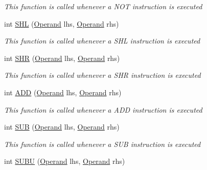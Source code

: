 \begin{DoxyCompactItemize}
\begin{DoxyCompactList}\small\item\em This function is called whenever a N\+O\+T instruction is executed \end{DoxyCompactList}\item 
int \hyperlink{class_c_p_u___o_s___simulator_1_1_c_p_u_1_1_instruction_ad5e8679e646e772e6fb2d7655bad9f6f}{S\+H\+L} (\hyperlink{class_c_p_u___o_s___simulator_1_1_c_p_u_1_1_operand}{Operand} lhs, \hyperlink{class_c_p_u___o_s___simulator_1_1_c_p_u_1_1_operand}{Operand} rhs)
\begin{DoxyCompactList}\small\item\em This function is called whenever a S\+H\+L instruction is executed \end{DoxyCompactList}\item 
int \hyperlink{class_c_p_u___o_s___simulator_1_1_c_p_u_1_1_instruction_a5796880f8494dab4070d151f3e4b2301}{S\+H\+R} (\hyperlink{class_c_p_u___o_s___simulator_1_1_c_p_u_1_1_operand}{Operand} lhs, \hyperlink{class_c_p_u___o_s___simulator_1_1_c_p_u_1_1_operand}{Operand} rhs)
\begin{DoxyCompactList}\small\item\em This function is called whenever a S\+H\+R instruction is executed \end{DoxyCompactList}\item 
int \hyperlink{class_c_p_u___o_s___simulator_1_1_c_p_u_1_1_instruction_a0c627b3cf43f2bf9d196800fbc7dc476}{A\+D\+D} (\hyperlink{class_c_p_u___o_s___simulator_1_1_c_p_u_1_1_operand}{Operand} lhs, \hyperlink{class_c_p_u___o_s___simulator_1_1_c_p_u_1_1_operand}{Operand} rhs)
\begin{DoxyCompactList}\small\item\em This function is called whenever a A\+D\+D instruction is executed \end{DoxyCompactList}\item 
int \hyperlink{class_c_p_u___o_s___simulator_1_1_c_p_u_1_1_instruction_a24caa7b8d57d9fa4e839b45ce2b2816e}{S\+U\+B} (\hyperlink{class_c_p_u___o_s___simulator_1_1_c_p_u_1_1_operand}{Operand} lhs, \hyperlink{class_c_p_u___o_s___simulator_1_1_c_p_u_1_1_operand}{Operand} rhs)
\begin{DoxyCompactList}\small\item\em This function is called whenever a S\+U\+B instruction is executed \end{DoxyCompactList}\item 
int \hyperlink{class_c_p_u___o_s___simulator_1_1_c_p_u_1_1_instruction_a612e041210347726cc65bfa4401af561}{S\+U\+B\+U} (\hyperlink{class_c_p_u___o_s___simulator_1_1_c_p_u_1_1_operand}{Operand} lhs, \hyperlink{class_c_p_u___o_s___simulator_1_1_c_p_u_1_1_operand}{Operand} rhs)

\end{DoxyCompactItemize}
